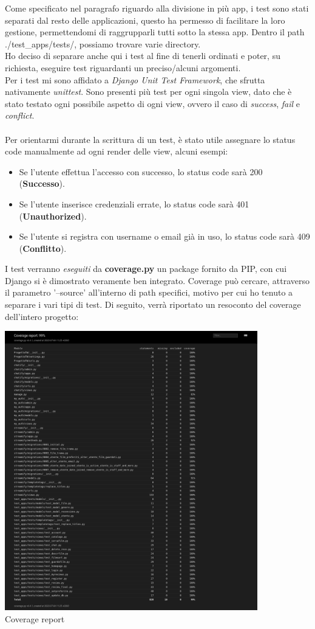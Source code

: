 \documentclass[12pt]{article}
\begin{document}
	\noindent Come specificato nel paragrafo riguardo alla divisione in più app, i test sono stati separati dal resto delle applicazioni, questo ha permesso di facilitare la loro gestione, permettendomi di raggrupparli tutti sotto la stessa app. Dentro il path ./test\_apps/tests/, possiamo trovare varie directory. \\Ho deciso di separare anche qui i test al fine di tenerli ordinati e poter, su richiesta, eseguire test riguardanti un preciso/alcuni argomenti. \\
	Per i test mi sono affidato a \textit{Django Unit Test Framework}, che sfrutta nativamente \textit{unittest}.
	Sono presenti più test per ogni singola view, dato che è stato testato ogni possibile aspetto di ogni view, ovvero il caso di \textit{success}, \textit{fail} e \textit{conflict}. \\ \\
	Per orientarmi durante la scrittura di un test, è stato utile assegnare lo status code manualmente ad ogni render delle view, alcuni esempi:
	\begin{itemize}
		\item Se l'utente effettua l'accesso con successo, lo status code sarà 200 (\textbf{Successo}).
		\item Se l'utente inserisce credenziali errate, lo status code sarà 401 (\textbf{Unauthorized}).
		\item Se l'utente si registra con username o email già in uso, lo status code sarà 409 (\textbf{Conflitto}).
	\end{itemize}

	\noindent I test verranno \textit{eseguiti} da \textbf{coverage.py} un package fornito da PIP, con cui Django si è dimostrato veramente ben integrato. Coverage può cercare, attraverso il parametro '--source' all'interno di path specifici, motivo per cui ho tenuto a separare i vari tipi di test. Di seguito, verrà riportato un resoconto del coverage dell'intero progetto:
	
	\centering \includegraphics[width=11cm, ]{Immagini/coverage_report.png} \\
	\centering Coverage report
\end{document}
